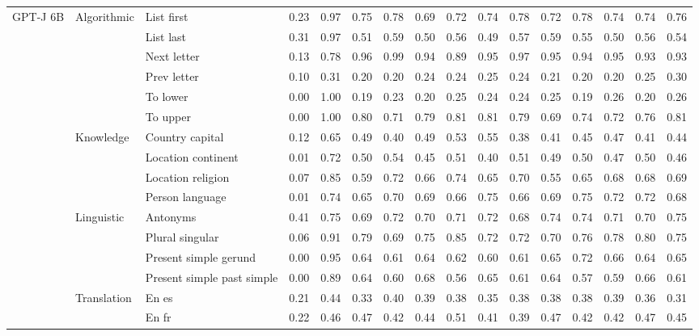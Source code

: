 \begin{center}
\begin{longtable}{lllrrrrrrrrrrrrr}
\multirow[t]{18}{*}{GPT-J 6B} & \multirow[t]{6}{*}{Algorithmic} & List first & 0.23 & 0.97 & 0.75 & 0.78 & 0.69 & 0.72 & 0.74 & 0.78 & 0.72 & 0.78 & 0.74 & 0.74 & 0.76 \\
 &  & List last & 0.31 & 0.97 & 0.51 & 0.59 & 0.50 & 0.56 & 0.49 & 0.57 & 0.59 & 0.55 & 0.50 & 0.56 & 0.54 \\
 &  & Next letter & 0.13 & 0.78 & 0.96 & 0.99 & 0.94 & 0.89 & 0.95 & 0.97 & 0.95 & 0.94 & 0.95 & 0.93 & 0.93 \\
 &  & Prev letter & 0.10 & 0.31 & 0.20 & 0.20 & 0.24 & 0.24 & 0.25 & 0.24 & 0.21 & 0.20 & 0.20 & 0.25 & 0.30 \\
 &  & To lower & 0.00 & 1.00 & 0.19 & 0.23 & 0.20 & 0.25 & 0.24 & 0.24 & 0.25 & 0.19 & 0.26 & 0.20 & 0.26 \\
 &  & To upper & 0.00 & 1.00 & 0.80 & 0.71 & 0.79 & 0.81 & 0.81 & 0.79 & 0.69 & 0.74 & 0.72 & 0.76 & 0.81 \\
\cline{2-16}
 & \multirow[t]{4}{*}{Knowledge} & Country capital & 0.12 & 0.65 & 0.49 & 0.40 & 0.49 & 0.53 & 0.55 & 0.38 & 0.41 & 0.45 & 0.47 & 0.41 & 0.44 \\
 &  & Location continent & 0.01 & 0.72 & 0.50 & 0.54 & 0.45 & 0.51 & 0.40 & 0.51 & 0.49 & 0.50 & 0.47 & 0.50 & 0.46 \\
 &  & Location religion & 0.07 & 0.85 & 0.59 & 0.72 & 0.66 & 0.74 & 0.65 & 0.70 & 0.55 & 0.65 & 0.68 & 0.68 & 0.69 \\
 &  & Person language & 0.01 & 0.74 & 0.65 & 0.70 & 0.69 & 0.66 & 0.75 & 0.66 & 0.69 & 0.75 & 0.72 & 0.72 & 0.68 \\
\cline{2-16}
 & \multirow[t]{4}{*}{Linguistic} & Antonyms & 0.41 & 0.75 & 0.69 & 0.72 & 0.70 & 0.71 & 0.72 & 0.68 & 0.74 & 0.74 & 0.71 & 0.70 & 0.75 \\
 &  & Plural singular & 0.06 & 0.91 & 0.79 & 0.69 & 0.75 & 0.85 & 0.72 & 0.72 & 0.70 & 0.76 & 0.78 & 0.80 & 0.75 \\
 &  & Present simple gerund & 0.00 & 0.95 & 0.64 & 0.61 & 0.64 & 0.62 & 0.60 & 0.61 & 0.65 & 0.72 & 0.66 & 0.64 & 0.65 \\
 &  & Present simple past simple & 0.00 & 0.89 & 0.64 & 0.60 & 0.68 & 0.56 & 0.65 & 0.61 & 0.64 & 0.57 & 0.59 & 0.66 & 0.61 \\
\cline{2-16}
 & \multirow[t]{4}{*}{Translation} & En es & 0.21 & 0.44 & 0.33 & 0.40 & 0.39 & 0.38 & 0.35 & 0.38 & 0.38 & 0.38 & 0.39 & 0.36 & 0.31 \\
 &  & En fr & 0.22 & 0.46 & 0.47 & 0.42 & 0.44 & 0.51 & 0.41 & 0.39 & 0.47 & 0.42 & 0.42 & 0.47 & 0.45 \\

\end{longtable}
\end{center}
